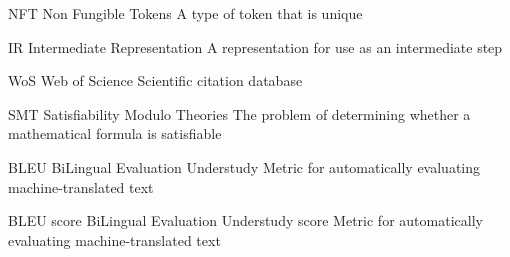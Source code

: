 


  {NFT}            %
  {Non Fungible Tokens}  %
  {A type of token that is unique} %

  {IR}            %
  {Intermediate Representation}  %
  {A representation for use as an intermediate step} %
  
  {WoS}            %
  {Web of Science}  %
  {Scientific citation database} %
  
  {SMT}            %
  {Satisfiability Modulo Theories}  %
  {The problem of determining whether a mathematical formula is satisfiable} %

  {BLEU}            %
  {BiLingual Evaluation Understudy}  %
  {Metric for automatically evaluating machine-translated text} %

  {BLEU score}            %
  {BiLingual Evaluation Understudy score}  %
  {Metric for automatically evaluating machine-translated text} %


